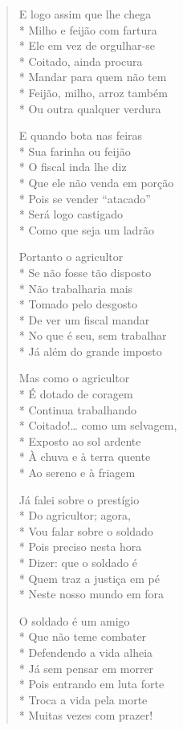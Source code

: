 \begin{verse}
E logo assim que lhe chega\\*
Milho e feijão com fartura\\*
Ele em vez de orgulhar-se\\*
Coitado, ainda procura\\*
Mandar para quem não tem\\*
Feijão, milho, arroz também\\*
Ou outra qualquer verdura

E quando bota nas feiras\\*
Sua farinha ou feijão\\*
O fiscal inda lhe diz\\*
Que ele não venda em porção\\*
Pois se vender ``atacado''\\*
Será logo castigado\\*
Como que seja um ladrão

Portanto o agricultor\\*
Se não fosse tão disposto\\*
Não trabalharia mais\\*
Tomado pelo desgosto\\*
De ver um fiscal mandar\\*
No que é seu, sem trabalhar\\*
Já além do grande imposto

Mas como o agricultor\\*
É dotado de coragem\\*
Continua trabalhando\\*
Coitado!\ldots{} como um selvagem,\\*
Exposto ao sol ardente\\*
À chuva e à terra quente\\*
Ao sereno e à friagem

Já falei sobre o prestígio\\*
Do agricultor; agora,\\*
Vou falar sobre o soldado\\*
Pois preciso nesta hora\\*
Dizer: que o soldado é\\*
Quem traz a justiça em pé\\*
Neste nosso mundo em fora

O soldado é um amigo\\*
Que não teme combater\\*
Defendendo a vida alheia\\*
Já sem pensar em morrer\\*
Pois entrando em luta forte\\*
Troca a vida pela morte\\*
Muitas vezes com prazer!


\end{verse}
